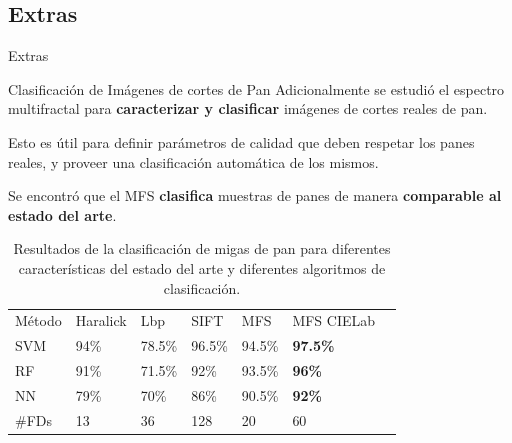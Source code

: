 \documentclass[spanish,unknownkeysallowed,10pt]{beamer}
\begin{document}
\subsection{Extras}

\begin{frame}
\begin{block}{}
\begin{center}
\vspace{1cm}
\huge{Extras}
\vspace{1cm}
\end{center}
\end{block}
\end{frame}

\begin{frame}{Clasificación de Imágenes de cortes de Pan}
Adicionalmente se estudió el espectro multifractal para \textbf{caracterizar y clasificar} imágenes de cortes reales de pan.

\vspace{0.3cm}

Esto es útil para definir parámetros de calidad que deben respetar los panes reales, y proveer una clasificación automática de los mismos.

\vspace{0.3cm}

Se encontró que el MFS \textbf{clasifica} muestras de panes de manera \textbf{comparable al estado del arte}.

\end{frame}

\begin{frame}
\begin{table}[h!]
\center
\begin{tabular}{lllllll}
\hline\noalign{\smallskip}
Método & Haralick & Lbp & SIFT & MFS & MFS CIELab\\ %
\noalign{\smallskip}\hline\noalign{\smallskip}
SVM & 94\% & 78.5\% & 96.5\% & 94.5\% & \textbf{97.5\%} \\
RF  & 91\% & 71.5\% & 92\% & 93.5\% & \textbf{96\%} \\
NN & 79\% & 70\% & 86\%  & 90.5\% & \textbf{92\%} \\
\noalign{\smallskip}\hline
\#FDs & 13 & 36 & 128 & 20 & 60\\
\hline
\end{tabular}
\caption{Resultados de la clasificación de migas de pan para diferentes características del estado del arte y diferentes algoritmos de clasificación.}
\label{tab:other} 
\end{table}
\end{frame}
\end{document}
